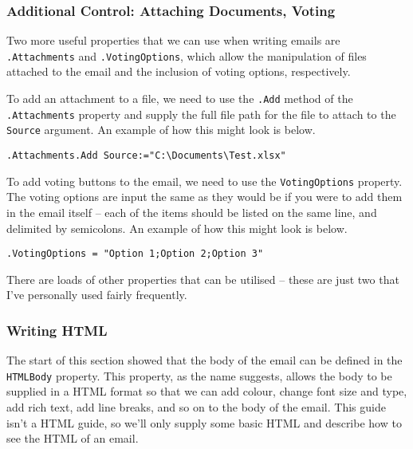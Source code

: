 \documentclass[11pt]{article}%
\begin{document}
\subsubsection{Additional Control: Attaching Documents, Voting}

Two more useful properties that we can use when writing emails are \texttt{.Attachments} and \texttt{.VotingOptions}, which allow the manipulation of files attached to the email and the inclusion of voting options, respectively.

To add an attachment to a file, we need to use the \texttt{.Add} method of the \texttt{.Attachments} property and supply the full file path for the file to attach to the \texttt{Source} argument. An example of how this might look is below.\\

\begin{lstlisting}[style=A]
    .Attachments.Add Source:="C:\Documents\Test.xlsx"
\end{lstlisting}

To add voting buttons to the email, we need to use the \texttt{VotingOptions} property. The voting options are input the same as they would be if you were to add them in the email itself -- each of the items should be listed on the same line, and delimited by semicolons. An example of how this might look is below.\\

\begin{lstlisting}[style=A]
    .VotingOptions = "Option 1;Option 2;Option 3"
\end{lstlisting}

There are loads of other properties that can be utilised -- these are just two that I've personally used fairly frequently.





\subsubsection{Writing HTML}

The start of this section showed that the body of the email can be defined in the \texttt{HTMLBody} property. This property, as the name suggests, allows the body to be supplied in a HTML format so that we can add colour, change font size and type, add rich text, add line breaks, and so on to the body of the email. This guide isn't a HTML guide, so we'll only supply some basic HTML and describe how to see the HTML of an email.
\end{document}

